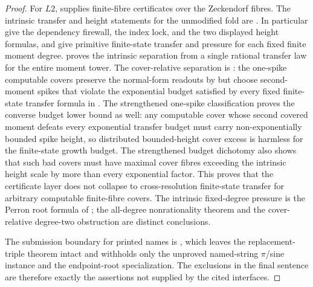 \begin{proof}
For \(L2\),  supplies finite-fibre certificates
over the Zeckendorf fibres.  The intrinsic transfer and height statements for
the unmodified fold are
.  In particular
 give the dependency firewall, the index lock, and the two displayed height formulas,
and
give primitive finite-state transfer and pressure for each fixed finite moment
degree.   proves the
intrinsic separation from a single rational transfer law for the entire moment
tower.  The cover-relative separation is
: the
one-spike computable covers preserve the normal-form readouts by
 but choose second-moment spikes that violate
the exponential budget satisfied by every fixed finite-state transfer formula in
.  The strengthened one-spike
classification  proves the converse
budget lower bound as well: any computable cover whose second covered moment
defeats every exponential transfer budget must carry non-exponentially bounded
spike height, so distributed bounded-height cover excess is harmless for the
finite-state growth budget.  The strengthened budget dichotomy
also shows that such bad covers must have maximal cover fibres exceeding the
intrinsic height scale by more than every exponential factor.  This proves that
the certificate layer does not collapse to cross-resolution finite-state transfer
for arbitrary computable finite-fibre covers.
The intrinsic fixed-degree pressure is the Perron root formula of
;
the all-degree nonrationality theorem and the cover-relative degree-two
obstruction are distinct conclusions.

The submission boundary for printed names is
, which leaves the
replacement-triple theorem intact and withholds only the unproved named-string
\(\pi\)/sine instance and the endpoint-root specialization.  The exclusions in
the final sentence are therefore exactly the assertions not supplied by the
cited interfaces.
\end{proof}

